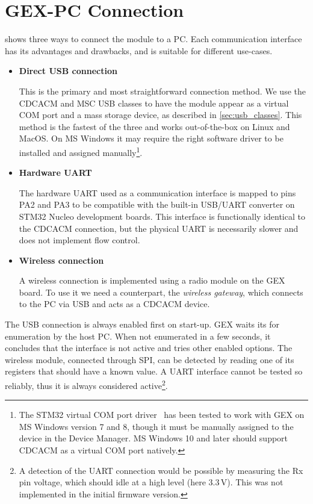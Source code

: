 \section{GEX-PC Connection}

 shows three ways to connect the module to a \gls{PC}. Each communication interface has its advantages and drawbacks, and is suitable for different use-cases.

\begin{itemize}
	\item \textbf{Direct \gls{USB} connection}
		
		This is the primary and most straightforward connection method. We use the \gls{CDCACM} and \gls{MSC} \gls{USB} classes to have the module appear as a virtual COM port and a mass storage device, as described in \cref{sec:usb_classes}. This method is the fastest of the three and works out-of-the-box on Linux and MacOS. On MS Windows it may require the right software driver to be installed and assigned manually\footnote{The STM32 virtual COM port driver~\cite{stm-vcom} has been tested to work with GEX on MS Windows version 7 and 8, though it must be manually assigned to the device in the Device Manager. MS Windows 10 and later should support \gls{CDCACM} as a virtual COM port natively.}.
	
	\item \textbf{Hardware \gls{UART}}
	
		The hardware UART used as a communication interface is mapped to pins PA2 and PA3 to be compatible with the built-in \gls{USB}/\gls{UART} converter on STM32 Nucleo development boards. This interface is functionally identical to the \gls{CDCACM} connection, but the physical \gls{UART} is necessarily slower and does not implement flow control.
		
	\item \textbf{Wireless connection}
	
		A wireless connection is implemented using a radio module on the GEX board. To use it we need a counterpart, the \textit{wireless gateway}, which connects to the \gls{PC} via \gls{USB} and acts as a \gls{CDCACM} device.
	
\end{itemize}

The \gls{USB} connection is always enabled first on start-up. GEX waits its for enumeration by the host \gls{PC}. When not enumerated in a few seconds, it concludes that the interface is not active and tries other enabled options. The wireless module, connected through \gls{SPI}, can be detected by reading one of its registers that should have a known value. A \gls{UART} interface cannot be tested so reliably, thus it is always considered active\footnote{A detection of the UART connection would be possible by measuring the Rx pin voltage, which should idle at a high level (here 3.3\,V). This was not implemented in the initial firmware version.}.


